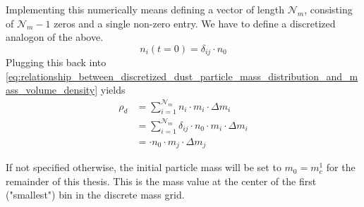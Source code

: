     Implementing this numerically means defining a vector of length $\mathcal N_m$, consisting of 
    $\mathcal N_m-1$ zeros and a single non-zero entry.
    We have to define a discretized analogon of the above.
    \begin{equation}
        n_i(t=0) = \delta_{ij} \cdot n_0
    \end{equation}
    Plugging this back into 
    \cref{eq:relationship_between_discretized_dust_particle_mass_distribution_and_mass_volume_density}
    yields
    \begin{align}
        \rho_d 
            &= \sum_{i=1}^{\mathcal N_m} n_i \cdot m_i \cdot \Delta m_i \\
            &= \sum_{i=1}^{\mathcal N_m} \delta_{ij} \cdot n_0 \cdot m_i \cdot \Delta m_i \\
            &= \cdot n_0 \cdot m_j \cdot \Delta m_j
    \end{align}


    If not specified otherwise, the initial particle mass will be set to $m_0 = m_c^1$ for the
    remainder of this thesis. This is the mass value at the center of the first ("smallest") bin 
    in the discrete mass grid.











































